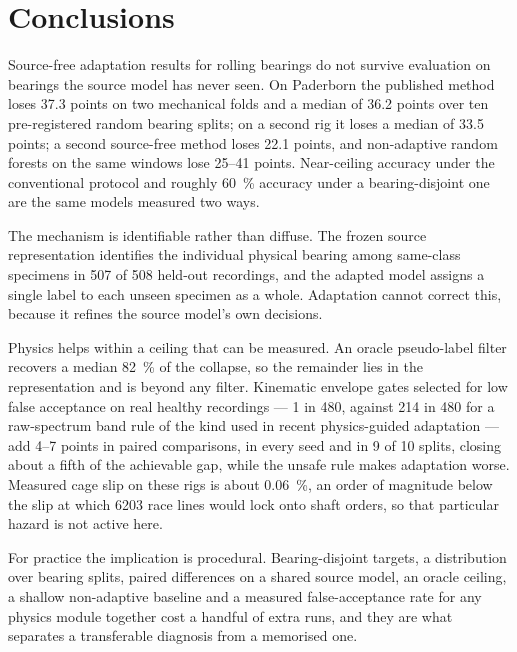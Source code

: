 \section{Conclusions}
\label{sec:conclusions}

Source-free adaptation results for rolling bearings do not survive evaluation on bearings the source model has never seen.
On Paderborn the published method loses 37.3 points on two mechanical folds and a median of 36.2 points over ten
pre-registered random bearing splits; on a second rig it loses a median of 33.5 points; a second source-free method loses
22.1 points, and non-adaptive random forests on the same windows lose 25--41 points. Near-ceiling accuracy under the
conventional protocol and roughly \SI{60}{\percent} accuracy under a bearing-disjoint one are the same models measured two
ways.

The mechanism is identifiable rather than diffuse. The frozen source representation identifies the individual physical
bearing among same-class specimens in 507 of 508 held-out recordings, and the adapted model assigns a single label to each
unseen specimen as a whole. Adaptation cannot correct this, because it refines the source model's own decisions.

Physics helps within a ceiling that can be measured. An oracle pseudo-label filter recovers a median \SI{82}{\percent} of
the collapse, so the remainder lies in the representation and is beyond any filter. Kinematic envelope gates selected for
low false acceptance on real healthy recordings --- 1 in 480, against 214 in 480 for a raw-spectrum band rule of the kind
used in recent physics-guided adaptation --- add 4--7 points in paired comparisons, in every seed and in 9 of 10 splits,
closing about a fifth of the achievable gap, while the unsafe rule makes adaptation worse. Measured cage slip on these rigs
is about \SI{0.06}{\percent}, an order of magnitude below the slip at which 6203 race lines would lock onto shaft orders, so
that particular hazard is not active here.

For practice the implication is procedural. Bearing-disjoint targets, a distribution over bearing splits, paired
differences on a shared source model, an oracle ceiling, a shallow non-adaptive baseline and a measured false-acceptance
rate for any physics module together cost a handful of extra runs, and they are what separates a transferable diagnosis
from a memorised one.
